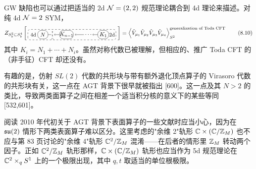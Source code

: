 GW 缺陷也可以通过把适当的 2d $\mathcal{N}=(2,2)$ 规范理论耦合到 4d 理论来描述。对纯 4d $\mathcal{N}=2$ SYM，
\begin{equation}
    Z_{S^2_b\subset S^4_b}\left[\,
    \begin{tikzpicture}[scale=1.0,baseline=(current bounding box.center)]
      \draw[gray,dashed,thick,rounded corners=4pt] (0,0) rectangle (5.42,0.64);
      \node[font=\small] at (0.33,0.32) {4d};
      \draw[rounded corners=0.24cm] (0.60,0.06) rectangle (1.24,0.58);
      \node at (0.92,0.32) {$N$};
      \draw (1.24,0.32) -- (1.44,0.32);
      \draw[gray,dashed,thick] (1.44,0.02) .. controls (1.55,0.15) and (1.55,0.49) .. (1.44,0.62);
      \draw[gray,dashed,thick] (1.58,0.02) .. controls (1.47,0.15) and (1.47,0.49) .. (1.58,0.62);
      \draw[->] (1.95,0.32) -- (1.62,0.32);
      \draw[rounded corners=0.24cm] (1.95,0.06) rectangle (2.80,0.58);
      \node at (2.375,0.32) {$K_{n-1}$};
      \draw[->] (3.45,0.32) -- (2.90,0.32);
      \node at (3.75,0.32) {$\cdots$};
      \draw[->] (4.30,0.32) -- (3.98,0.32);
      \draw[rounded corners=0.24cm] (4.30,0.06) rectangle (4.98,0.58);
      \node at (4.64,0.32) {$K_1$};
      \node[font=\small] at (5.18,0.32) {2d};
    \end{tikzpicture}
    \,\right]
    =\left\langle\hat V_{\mu_1}\hat V_{\mu_2}\hat V_{\mu_3}\hat V_{\mu_4}\right\rangle^{\text{generalization of Toda CFT}}_{S^2}
    \tag{8.10}
\end{equation}
其中 $K_i=N_1+\cdots+N_i$。虽然对称代数已被理解，但相应的、推广 Toda CFT 的（非手征）CFT 却还没有。

有趣的是，仿射 $SL(2)$ 代数的共形块与带有额外退化顶点算子的 Virasoro 代数的共形块有关，这一点在 AGT 背景下很早就被指出 [600]。这一点及其 $N>2$ 的类比，导致两类面算子之间在相差一个适当积分核的意义下的某些等同 [532,601]。

阅读 2010 年代初关于 AGT 背景下表面算子的一些文献时应当小心，因为在 $\mathfrak{su}(2)$ 情形下两类表面算子难以区分。这里考虑的"余维 2"轨形 $\mathbb{C}\times(\mathbb{C}/\mathbb{Z}_M)$ 也不应与第 83 页讨论的"余维 4"轨形 $\mathbb{C}^2/\mathbb{Z}_M$ 混淆------在后者的情形里 $\mathbb{Z}_M$ 转动两个因子。正如 $\mathbb{C}^2/\mathbb{Z}_M$ 轨形那样，$\mathbb{C}\times(\mathbb{C}/\mathbb{Z}_M)$ 轨形也应当作为 5d 规范理论在 $\mathbb{C}^2\times_q S^1$ 上的一个极限出现，其中 $q,t$ 取适当的单位根极限。

